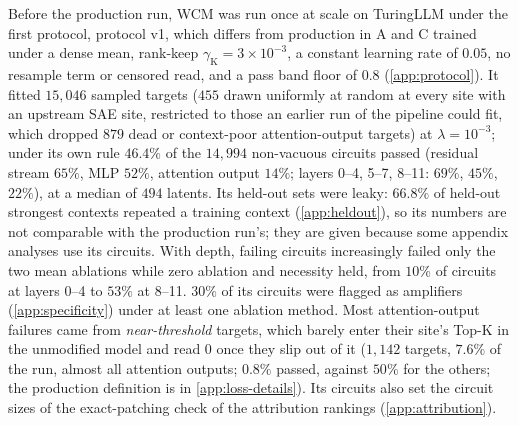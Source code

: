 \documentclass[10pt]{article}
\begin{document}
Before the production run, WCM was run once at scale on TuringLLM under the first protocol, protocol v1, which differs from production in A and C trained under a dense mean, rank-keep $\gamma_{\mathrm{K}} = 3 \times 10^{-3}$, a constant learning rate of $0.05$, no resample term or censored read, and a pass band floor of $0.8$ (\cref{app:protocol}).
It fitted $15{,}046$ sampled targets ($455$ drawn uniformly at random at every site with an upstream SAE site, restricted to those an earlier run of the pipeline could fit, which dropped $879$ dead or context-poor attention-output targets) at $\lambda = 10^{-3}$; under its own rule $46.4\%$ of the $14{,}994$ non-vacuous circuits passed (residual stream $65\%$, MLP $52\%$, attention output $14\%$; layers 0--4, 5--7, 8--11: $69\%$, $45\%$, $22\%$), at a median of $494$ latents.
Its held-out sets were leaky: $66.8\%$ of held-out strongest contexts repeated a training context (\cref{app:heldout}), so its numbers are not comparable with the production run's; they are given because some appendix analyses use its circuits.
With depth, failing circuits increasingly failed only the two mean ablations while zero ablation and necessity held, from $10\%$ of circuits at layers 0--4 to $53\%$ at 8--11.
$30\%$ of its circuits were flagged as amplifiers (\cref{app:specificity}) under at least one ablation method.
Most attention-output failures came from \emph{near-threshold} targets, which barely enter their site's Top-K in the unmodified model and read $0$ once they slip out of it ($1{,}142$ targets, $7.6\%$ of the run, almost all attention outputs; $0.8\%$ passed, against $50\%$ for the others; the production definition is in \cref{app:loss-details}).
Its circuits also set the circuit sizes of the exact-patching check of the attribution rankings (\cref{app:attribution}).

\FloatBarrier

\FloatBarrier   %
\end{document}
